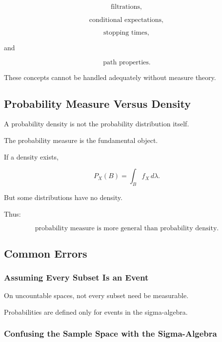 \[
\text{filtrations},
\]

\[
\text{conditional expectations},
\]

\[
\text{stopping times},
\]

and

\[
\text{path properties}.
\]

These concepts cannot be handled adequately without measure theory.

\subsection{Probability Measure Versus Density}
\label{subsec:measure-versus-density}

A probability density is not the probability distribution itself.

The probability measure is the fundamental object.

If a density exists,

\[
\boxed{
P_X(B)
=
\int_B
f_X\,d\lambda.
}
\]

But some distributions have no density.

Thus:

\[
\boxed{
\text{probability measure}
\text{ is more general than }
\text{probability density}.
}
\]

\subsection{Common Errors}
\label{subsec:measure-probability-common-errors}

\subsubsection{Assuming Every Subset Is an Event}

On uncountable spaces, not every subset need be measurable.

Probabilities are defined only for events in the sigma-algebra.

\subsubsection{Confusing the Sample Space with the Sigma-Algebra}

